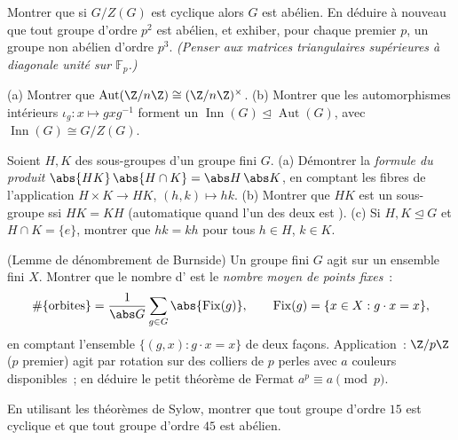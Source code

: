 \begin{exercise}[$\star$]\label{exo:b3:groups:2}
Montrer que si $G/Z(G)$ est cyclique alors $G$ est abélien. En
déduire à nouveau que tout groupe d'ordre $p^2$ est abélien, et
exhiber, pour chaque premier $p$, un groupe non abélien d'ordre
$p^3$. \emph{(Penser aux matrices triangulaires supérieures à
diagonale unité sur $\mathbb F_p$.)}
\end{exercise}

\begin{exercise}[$\star$]\label{exo:b3:groups:3}
(a) Montrer que $\operatorname{Aut}(\Z/n\Z) \cong (\Z/n\Z)^\times$.
(b) Montrer que les automorphismes intérieurs $\iota_g \colon x
\mapsto gxg^{-1}$ forment un 
$\operatorname{Inn}(G) \trianglelefteq \operatorname{Aut}(G)$,
avec $\operatorname{Inn}(G) \cong G/Z(G)$.
\end{exercise}

\begin{exercise}[$\star\star$]\label{exo:b3:groups:4}
Soient $H, K$ des sous-groupes d'un groupe fini $G$.
(a) Démontrer la \emph{formule du produit} $\abs{HK}\,\abs{H\cap
K} = \abs H\, \abs K$, en comptant les fibres de l'application $H
\times K \to HK$, $(h,k) \mapsto hk$.
(b) Montrer que $HK$ est un sous-groupe ssi $HK = KH$
(automatique quand l'un des deux est ).
(c) Si $H, K \trianglelefteq G$ et $H \cap K = \{e\}$, montrer que
$hk = kh$ pour tous $h \in H$, $k \in K$.
\end{exercise}

\begin{exercise}[$\star\star$]\label{exo:b3:groups:5}
(Lemme de dénombrement de Burnside) Un groupe fini $G$ agit sur
un ensemble fini $X$. Montrer que le nombre d' est le
\emph{nombre moyen de points fixes}~:
\[
\#\{\text{orbites}\} = \frac{1}{\abs G}\sum_{g \in G}
\abs{\operatorname{Fix}(g)},
\qquad \operatorname{Fix}(g) = \{x \in X : g \cdot x = x\},
\]
en comptant l'ensemble $\{(g,x) : g\cdot x = x\}$ de deux façons.
Application~: $\Z/p\Z$ ($p$ premier) agit par rotation sur des
colliers de $p$ perles avec $a$ couleurs disponibles~; en déduire
le petit théorème de Fermat $a^p \equiv a \pmod p$.
\end{exercise}

\begin{exercise}[$\star$]\label{exo:b3:groups:6}
En utilisant les théorèmes de Sylow, montrer que tout groupe
d'ordre $15$ est cyclique et que tout groupe d'ordre $45$ est
abélien.
\end{exercise}

